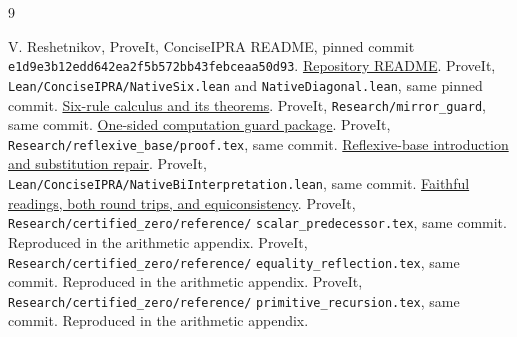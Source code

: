 \documentclass[11pt]{article}
\theoremstyle{definition}\newtheorem{definition}[theorem]{Definition}
\begin{document}
\clearpage
\begin{thebibliography}{9}
\raggedright
{} V. Reshetnikov, ProveIt, ConciseIPRA README, pinned commit
\texttt{e1d9e3b12edd642ea2f5b572bb43febceaa50d93}.
\href{https://github.com/VladimirReshetnikov/ProveIt/blob/e1d9e3b12edd642ea2f5b572bb43febceaa50d93/Logic/PrimitiveRecursiveArithmetic/ConciseIPRA/README.md}{Repository README}.
 ProveIt, \texttt{Lean/ConciseIPRA/NativeSix.lean} and
\texttt{NativeDiagonal.lean}, same pinned commit.
\href{https://github.com/VladimirReshetnikov/ProveIt/blob/e1d9e3b12edd642ea2f5b572bb43febceaa50d93/Logic/PrimitiveRecursiveArithmetic/ConciseIPRA/Lean/ConciseIPRA/NativeSix.lean}{Six-rule calculus and its theorems}.
 ProveIt, \texttt{Research/mirror\_guard}, same commit.
\href{https://github.com/VladimirReshetnikov/ProveIt/tree/e1d9e3b12edd642ea2f5b572bb43febceaa50d93/Logic/PrimitiveRecursiveArithmetic/ConciseIPRA/Research/mirror_guard}{One-sided computation guard package}.
 ProveIt, \texttt{Research/reflexive\_base/proof.tex},
same commit.
\href{https://github.com/VladimirReshetnikov/ProveIt/blob/e1d9e3b12edd642ea2f5b572bb43febceaa50d93/Logic/PrimitiveRecursiveArithmetic/ConciseIPRA/Research/reflexive_base/proof.tex}{Reflexive-base introduction and substitution repair}.
 ProveIt, \texttt{Lean/ConciseIPRA/NativeBiInterpretation.lean},
same commit.
\href{https://github.com/VladimirReshetnikov/ProveIt/blob/e1d9e3b12edd642ea2f5b572bb43febceaa50d93/Logic/PrimitiveRecursiveArithmetic/ConciseIPRA/Lean/ConciseIPRA/NativeBiInterpretation.lean}{Faithful readings, both round trips, and equiconsistency}.
 ProveIt, \texttt{Research/certified\_zero/reference/}\allowbreak
\texttt{scalar\_predecessor.tex}, same commit. Reproduced in the arithmetic appendix.
 ProveIt, \texttt{Research/certified\_zero/reference/}\allowbreak
\texttt{equality\_reflection.tex}, same commit. Reproduced in the arithmetic appendix.
 ProveIt, \texttt{Research/certified\_zero/reference/}\allowbreak
\texttt{primitive\_recursion.tex}, same commit. Reproduced in the arithmetic appendix.
\end{thebibliography}
\end{document}
